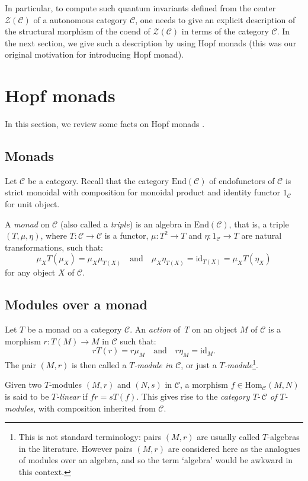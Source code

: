 \documentclass[a4paper]{amsart}
\theoremstyle{definition}
\newcommand{\co}{\colon}
\newcommand{\id}{\mathrm{id}}
\newcommand{\cc}{\mathcal{C}}
\newcommand{\zz}{\mathcal{Z}}
\newcommand{\ti}{\mbox{-}\,}
\newcommand{\End}{\mathrm{End}}
\newcommand{\Hom}{\mathrm{Hom}}
\begin{document}
In particular, to compute such quantum invariants defined from the center $\zz(\cc)$ of a autonomous category $\cc$, one
needs to give an explicit description of the structural morphism of the coend of $\zz(\cc)$ in terms of the category $\cc$.
In the next section, we give such a description by using Hopf monads (this was our original motivation for introducing Hopf
monad).

\section{Hopf monads}\label{Sect-monad}

In this section, we review some facts on Hopf monads \cite{BV2}.

\subsection{Monads}
Let $\cc$ be a category. Recall that the category $\End(\cc)$ of endofunctors of $\cc$ is strict monoidal with composition
for monoidal product and identity functor $1_\cc$ for unit object.

A \emph{monad} on $\cc$  (also called a \emph{triple}) is an algebra in $\End(\cc)$, that is, a triple $(T,\mu,\eta)$, where
$T\co \cc \to \cc$ is a functor, $\mu\co T^2 \to T$ and $\eta\co 1_\cc \to T$ are natural transformations, such that:
\begin{equation*}
\mu_X T(\mu_X)=\mu_X\mu_{T(X)} \quad \text{and} \quad \mu_X\eta_{T(X)}=\id_{T(X)}=\mu_X T(\eta_X)
\end{equation*}
for any object $X$ of $\cc$.

\subsection{Modules over a monad} Let $T$ be a monad on a category $\cc$. An \emph{action} of~$T$ on an object $M$
of $\cc$ is a morphism $r\co T(M) \to M$ in $\cc$ such that:
\begin{equation*}
r T(r)= r \mu_M \quad \text{and} \quad r \eta_M= \id_M.
\end{equation*}
The pair $(M,r)$ is then called a \emph{$T$-module in $\cc$}, or just a \emph{$T$-module}\footnote{This is not standard
terminology: pairs $(M,r)$ are usually called $T$-algebras in the literature. However pairs $(M,r)$ are considered here as
the analogues of modules over an algebra, and so the term `algebra' would be awkward in this context.}.

Given two $T$-modules $(M,r)$ and $(N,s)$ in $\cc$, a morphism $f\in \Hom_\cc(M,N)$ is said to be \emph{$T$-linear} if $f
r=s T(f)$. This gives rise to the \emph{category $T\ti\cc$ of $T$-modules}, with composition inherited from $\cc$.
\end{document}
